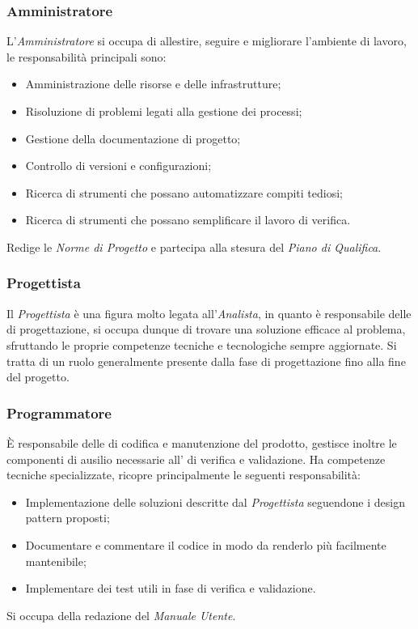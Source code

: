 \documentclass{scalatekids-article}
\begin{document}
\subsubsection{Amministratore}
L'\textit{Amministratore} si occupa di allestire, seguire e migliorare
l'ambiente di lavoro, le responsabilità principali sono:
\begin{itemize}
\item Amministrazione delle risorse e delle infrastrutture;
\item Risoluzione di problemi legati alla gestione dei processi;
\item Gestione della documentazione di progetto;
\item Controllo di versioni e configurazioni;
\item Ricerca di strumenti che possano automatizzare compiti tediosi;
\item Ricerca di strumenti che possano semplificare il lavoro di verifica.
\end{itemize}
Redige le \textit{Norme di Progetto} e partecipa alla stesura del \textit{Piano
  di Qualifica}.
\subsubsection{Progettista}
Il \textit{Progettista} è una figura molto legata all'\textit{Analista}, in
quanto è responsabile delle  di progettazione, si occupa dunque di
trovare una soluzione efficace al problema, sfruttando le proprie competenze
tecniche e tecnologiche sempre aggiornate. Si tratta di un ruolo generalmente
presente dalla fase di progettazione fino alla fine del progetto.
\subsubsection{Programmatore}
È responsabile delle  di codifica e manutenzione del prodotto, gestisce
inoltre le componenti di ausilio necessarie all' di verifica e
validazione. Ha competenze tecniche specializzate, ricopre principalmente
le seguenti responsabilità:
\begin{itemize}
\item Implementazione delle soluzioni descritte dal \textit{Progettista}
  seguendone i design pattern proposti;
\item Documentare e commentare il codice in modo da renderlo più facilmente
  mantenibile;
\item Implementare dei test utili in fase di verifica e validazione.
\end{itemize}
Si occupa della redazione del \textit{Manuale Utente}.
\end{document}
